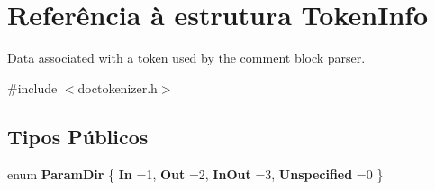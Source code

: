 \hypertarget{struct_token_info}{\section{Referência à estrutura Token\-Info}
\label{struct_token_info}
}


Data associated with a token used by the comment block parser.  




{\ttfamily \#include $<$doctokenizer.\-h$>$}

\subsection*{Tipos Públicos}
\begin{DoxyCompactItemize}
\item 
enum {\bfseries Param\-Dir} \{ {\bfseries In} =1, 
{\bfseries Out} =2, 
{\bfseries In\-Out} =3, 
{\bfseries Unspecified} =0
 \}
\end{DoxyCompactItemize}
